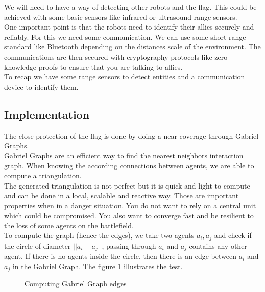 \documentclass[journal]{IEEEtran}
\begin{document}
We will need to have a way of detecting other robots and the flag.
This could be achieved with some basic sensors like infrared or ultrasound range sensors.\\

One important point is that the robots need to identify their allies securely and reliably. For this we need some communication. We can use some short range standard like Bluetooth depending on the distances scale of the environment. The communications are then secured with cryptography protocols like zero-knowledge proofs to ensure that you are talking to allies.\\

To recap we have some range sensors to detect entities and a communication device to identify them.

\subsection{Implementation}

The close protection of the flag is done by doing a near-coverage through Gabriel Graphs.\\

Gabriel Graphs are an efficient way to find the nearest neighbors interaction graph. When knowing the according connections between agents, we are able to compute a triangulation.\\
The generated triangulation is not perfect but it is quick and light to compute and can be done in a local, scalable and reactive way.
Those are important properties when in a danger situation. You do not want to rely on a central unit which could be compromised. You also want to converge fast and be resilient to the loss of some agents on the battlefield.\\

To compute the graph (hence the edges), we take two agents $a_i,a_j$ and check if the circle of diameter $||a_i-a_j||$, passing through $a_i$ and $a_j$ contains any other agent. If there is no agents inside the circle, then there is an edge between $a_i$ and $a_j$ in the Gabriel Graph.
The figure \ref{gab_edge} illustrates the test.\\
\begin{figure}
	\centering
	\qquad
	\caption{Computing Gabriel Graph edges}
	\label{gab_edge}
\end{figure}
\end{document}
